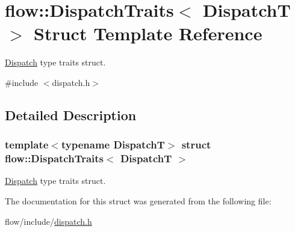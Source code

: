 \hypertarget{structflow_1_1_dispatch_traits}{}\section{flow\+:\+:Dispatch\+Traits$<$ DispatchT $>$ Struct Template Reference}
\label{structflow_1_1_dispatch_traits}


\hyperlink{classflow_1_1_dispatch}{Dispatch} type traits struct.  




{\ttfamily \#include $<$dispatch.\+h$>$}



\subsection{Detailed Description}
\subsubsection*{template$<$typename DispatchT$>$\newline
struct flow\+::\+Dispatch\+Traits$<$ Dispatch\+T $>$}

\hyperlink{classflow_1_1_dispatch}{Dispatch} type traits struct. 

The documentation for this struct was generated from the following file\+:\begin{DoxyCompactItemize}
\item 
flow/include/\hyperlink{dispatch_8h}{dispatch.\+h}\end{DoxyCompactItemize}

